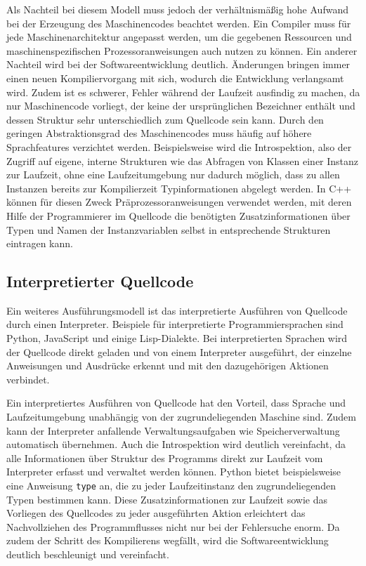 \documentclass[11pt, parskip=half]{scrartcl}       %
\begin{document}
Als Nachteil bei diesem Modell muss jedoch der verhältnismäßig hohe Aufwand bei der Erzeugung des Maschinencodes beachtet werden.
Ein Compiler muss für jede Maschinenarchitektur angepasst werden, um die gegebenen Ressourcen und maschinenspezifischen Prozessoranweisungen auch nutzen zu können.
Ein anderer Nachteil wird bei der Softwareentwicklung deutlich.
Änderungen bringen immer einen neuen Kompiliervorgang mit sich, wodurch die Entwicklung verlangsamt wird.
Zudem ist es schwerer, Fehler während der Laufzeit ausfindig zu machen, da nur Maschinencode vorliegt, der keine der ursprünglichen Bezeichner enthält und dessen Struktur sehr unterschiedlich zum Quellcode sein kann.
Durch den geringen Abstraktionsgrad des Maschinencodes muss häufig auf höhere Sprachfeatures verzichtet werden.\cite{quora_pros_and_cons_compiled_languages}
Beispielsweise wird die Introspektion, also der Zugriff auf eigene, interne Strukturen wie das Abfragen von Klassen einer Instanz zur Laufzeit, ohne eine Laufzeitumgebung nur dadurch möglich, dass zu allen Instanzen bereits zur Kompilierzeit Typinformationen abgelegt werden.\cite{reflexive_programmiersprachen}
In C++ können für diesen Zweck Präprozessoranweisungen verwendet werden, mit deren Hilfe der Programmierer im Quellcode die benötigten Zusatzinformationen über Typen und Namen der Instanzvariablen selbst in entsprechende Strukturen eintragen kann.

\subsection{Interpretierter Quellcode}

Ein weiteres Ausführungsmodell ist das interpretierte Ausführen von Quellcode durch einen Interpreter.
Beispiele für interpretierte Programmiersprachen sind Python, JavaScript und einige Lisp-Dialekte.
Bei interpretierten Sprachen wird der Quellcode direkt geladen und von einem Interpreter ausgeführt, der einzelne Anweisungen und Ausdrücke erkennt und mit den dazugehörigen Aktionen verbindet.

Ein interpretiertes Ausführen von Quellcode hat den Vorteil, dass Sprache und Laufzeitumgebung unabhängig von der zugrundeliegenden Maschine sind.
Zudem kann der Interpreter anfallende Verwaltungsaufgaben wie Speicherverwaltung automatisch übernehmen.
Auch die Introspektion wird deutlich vereinfacht, da alle Informationen über Struktur des Programms direkt zur Laufzeit vom Interpreter erfasst und verwaltet werden können.
Python bietet beispielsweise eine Anweisung \texttt{type} an, die zu jeder Laufzeitinstanz den zugrundeliegenden Typen bestimmen kann.
Diese Zusatzinformationen zur Laufzeit sowie das Vorliegen des Quellcodes zu jeder ausgeführten Aktion erleichtert das Nachvollziehen des Programmflusses nicht nur bei der Fehlersuche enorm.
Da zudem der Schritt des Kompilierens wegfällt, wird die Softwareentwicklung deutlich beschleunigt und vereinfacht.
\end{document}
